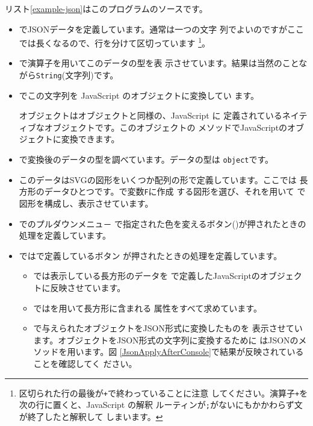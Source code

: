 リスト\ref{example-json}はこのプログラムのソースです。
\begin{itemize}
 \item {}でJSONデータを定義しています。通常は一つの文字
       列でよいのですがここでは長くなるので、行を分けて区切っています
       \footnote{区切られた行の最後が\texttt{+}で終わっていることに注意
       してください。演算子\texttt{+}を次の行に置くと、JavaScript の解釈
       ルーティンが\texttt{;}がないにもかかわらず文が終了したと解釈して
       しまいます。}。
 \item {}で演算子を用いてこのデータの型を表
       示させています。結果は当然のことながら\texttt{String}(文字列)です。
 \item {}でこの文字列を JavaScript のオブジェクトに変換してい
       ます。

 オブジェクトはオブジェクトと同様の、JavaScript に
       定義されているネイティブなオブジェクトです。このオブジェクトの
       メソッドでJavaScriptのオブジェクトに変換できます。
 \item {}で変換後のデータの型を調べています。データの型は
       \texttt{object}です。
 \item このデータはSVGの図形をいくつか配列の形で定義しています。ここでは
       長方形のデータひとつです。で変数\texttt{F}に作成
       する図形を選び、それを用いて
       で図形を構成し、表示させています。
  \item {}でのプルダウンメニュ－
       で指定された色を変えるボタン()が押されたときの処理を定義しています。
 \item {}ではで定義しているボタン
       が押されたときの処理を定義しています。
\begin{itemize}
 \item {}では表示している長方形のデータを
       で定義したJavaScriptのオブジェクトに反映させています。
 \item {}ではを用いて長方形に含まれる
       属性をすべて求めています。
 \item {}で与えられたオブジェクトをJSON形式に変換したものを
       表示させています。オブジェクトをJSON形式の文字列に変換するために
       はJSONのメソッドを用います。図
       \ref{JsonApplyAfterConsole}で結果が反映されていることを確認してく
       ださい。
\end{itemize}
\end{itemize}
